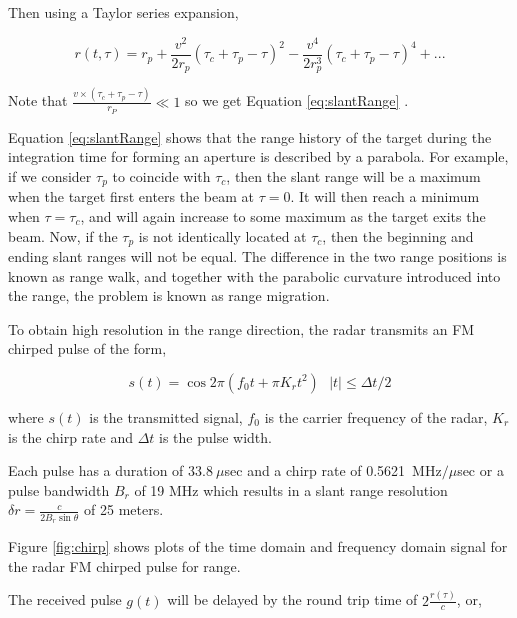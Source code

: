 Then using a Taylor series expansion,

\begin{equation}
\label{eq:slantRange3}
r(t,\tau) = r_p +\frac{v^2}{2r_p}(\tau_c+\tau_p-\tau)^2  - \frac{v^4}{2r_p^3}\left (\tau_c+\tau_p-\tau\right )^4 + ...
\end{equation}


Note that  $\frac{v\times(\tau_c+\tau_p-\tau)}{r_P} \ll 1 $ so we get Equation  \ref{eq:slantRange} .

Equation \ref{eq:slantRange} shows that the range history of the target during the integration time for forming an aperture is described by a parabola. For example, if we consider $\tau_p$ to coincide with $\tau_c$, then the slant range will be a maximum when the target first enters the beam at $\tau=0$. It will then reach a minimum when $\tau = \tau_c$, and will again increase to some maximum as the target exits the beam. Now, if the $\tau_p$ is not identically located at $\tau_c$, then the beginning and ending slant ranges will not be equal. The difference in the two range positions is known as range walk, and together with the parabolic curvature introduced into the range, the problem is known as range migration.




To obtain high resolution in the range direction, the radar transmits an FM chirped pulse of the form,

\begin{equation}
\label{ }
s(t)=\cos 2 \pi (f_0 t +\pi K_r t^2) ~~~ |t| \leq  \Delta t/2
\end{equation}

where $s(t)$ is the transmitted signal, $f_0$ is the carrier frequency of the radar, $K_r$ is the chirp rate and $\Delta t$ is the pulse width.




Each pulse has a duration of $33.8~\mu  $sec and a chirp rate of 0.5621~MHz$/\mu $sec or a pulse bandwidth $B_r$ of 19 MHz which results in a slant range resolution $\delta r= \frac{c}{2B_r \sin\theta}$ of 25 meters. 
\par

\par

Figure \ref{fig:chirp} shows plots of the time domain and frequency domain signal for the radar FM chirped pulse for range.
\par

The received pulse $g(t)$ will be delayed by the round trip time of $ 2 \frac{r(\tau )}{c}$, or,

